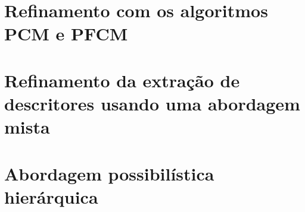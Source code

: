 

\section{Refinamento com os algoritmos PCM e PFCM}



\section{Refinamento da extração de descritores usando uma abordagem mista}



\section{Abordagem possibilística hierárquica}
